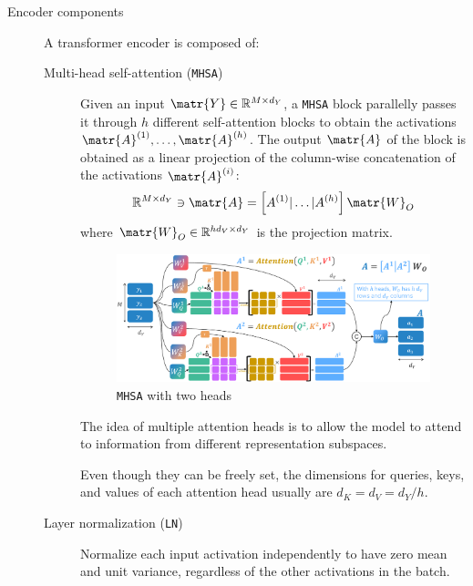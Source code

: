 \begin{description}
    \item[Encoder components]
        A transformer encoder is composed of:

        \begin{description}
            \item[Multi-head self-attention (\texttt{MHSA})] 
                Given an input $\matr{Y} \in \mathbb{R}^{M \times d_Y}$, a \texttt{MHSA} block parallelly passes it through $h$ different self-attention blocks to obtain the activations $\matr{A}^{(1)}, \dots, \matr{A}^{(h)}$. The output $\matr{A}$ of the block is obtained as a linear projection of the column-wise concatenation of the activations $\matr{A}^{(i)}$:
                \[ \mathbb{R}^{M \times d_Y} \ni \matr{A} = \left[ A^{(1)} \vert \dots \vert A^{(h)} \right] \matr{W}_O \]
                where $\matr{W}_O \in \mathbb{R}^{hd_V \times d_Y}$ is the projection matrix.

                \begin{figure}[H]
                    \centering
                    \includegraphics[width=0.7\linewidth]{./img/_multi_head_attention.pdf}
                    \caption{\texttt{MHSA} with two heads}
                \end{figure}

                \begin{remark}
                    The idea of multiple attention heads is to allow the model to attend to information from different representation subspaces.
                \end{remark}

                \begin{remark}
                    Even though they can be freely set, the dimensions for queries, keys, and values of each attention head usually are $d_K = d_V = d_Y/h$.
                \end{remark}

            \item[Layer normalization (\texttt{LN})] 
                Normalize each input activation independently to have zero mean and unit variance, regardless of the other activations in the batch.


\end{description}
\end{description}
